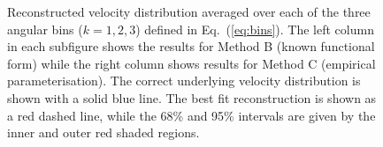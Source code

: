 \begin{figure}
\caption[Reconstructed binned velocity distributions]{Reconstructed velocity distribution averaged over each of the three angular bins ($k=1,2,3$) defined in Eq.~(\ref{eq:bins}). The left column in each subfigure shows the results for Method B (known functional form) while the right column shows results for Method C (empirical parameterisation). The correct underlying velocity distribution is shown with a solid blue line. The best fit reconstruction is shown as a red dashed line, while the 68\% and 95\% intervals are given by the inner and outer red shaded regions.}\label{fig:veldist}
\end{figure}

